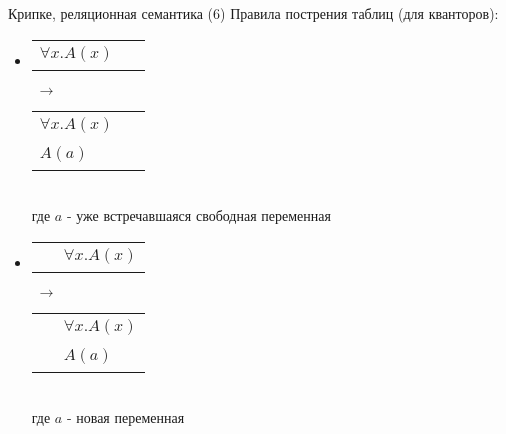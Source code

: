 \documentclass{beamer}
\begin{document}
\begin{frame}{Крипке, реляционная семантика (6)}
Правила пострения таблиц (для кванторов):\\
\bigskip
\begin{itemize}
  \item 
      \begin{tabular}{p{1.25cm}|p{1.25cm}}
        \hline
        $\forall x . A(x)$ & ~ \\
      \end{tabular}
      $\; \to \;$
      \begin{tabular}{p{1.25cm}|p{1.25cm}}
        \hline
        $\forall x . A(x)$ & ~ \\
        $A(a)$ & ~ \\
      \end{tabular}\\
      \bigskip
      {\scriptsize где $a$ - уже встречавшаяся свободная переменная}\\
      \bigskip
  \item 
      \begin{tabular}{p{1.25cm}|p{1.25cm}}
        \hline
        ~ & $\forall x . A(x)$ \\
      \end{tabular}
      $\; \to \;$
      \begin{tabular}{p{1.25cm}|p{1.25cm}}
        \hline
        ~ & $\forall x . A(x)$ \\
        ~ & $A(a)$ \\
      \end{tabular}\\
      \bigskip
      {\scriptsize где $a$ - новая переменная}
\end{itemize}
\end{frame}
\end{document}
